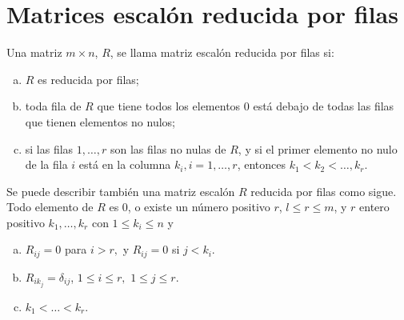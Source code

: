 \begin{comment}
	Generalizando obtenemos que para realizar el intercambio de $R_i$ y $R_j$, la secuencia de operaciones elementales de los otros tipos es: 

	\begin{enumerate}[a)]
	    \item $R_j\to R_j-R_i$. Restar fila $i$ de la fila $j$, que da como resultado una fila $j$ como el negativo de la fila original $i$.
	    \item $R_j\to -R_j$. Fila negativa $j$ lo que resultará en la fila $j$ cambiando a fila $i$.
	    \item $R_j\to R_i-R_j$. Restar fila $j$ de la fila $i$ que resultará en la fila $i$ cambiando a la fila original $j$.\\\\
	\end{enumerate}

    \item 

\end{enumerate}

\end{comment}

\section{Matrices escalón reducida por filas}

\begin{tcolorbox}
    \begin{def.}
	Una matriz $m\times n$, $R$, se llama matriz escalón reducida por filas si:
	\begin{enumerate}[(a)]
	    \item $R$ es reducida por filas;
	    \item toda fila de $R$ que tiene todos los elementos $0$ está debajo de todas las filas que tienen elementos no nulos;
	    \item si las filas $1,\ldots, r$ son las filas no nulas de $R$, y si el primer elemento no nulo de la fila $i$ está en la columna $k_i, i=1,\ldots, r$, entonces $k_1<k_2<\ldots,k_r.$
	\end{enumerate}
	Se puede describir también una matriz escalón $R$ reducida por filas como sigue. Todo elemento de $R$ es $0$, o existe un número positivo $r$, $l\leq r \leq m$, y $r$ entero positivo $k_1,\ldots ,k_r$ con $1\leq k_i\leq n$ y
	\begin{enumerate}[(a)]
	    \item $R_{ij}=0$ para $i>r,$ y $R_{ij}=0$ si $j<k_i$.
	    \item $R_{ik_j}=\delta_{ij}$, $1\leq i \leq r,$ $1\leq j\leq r$.
	    \item $k_1<\ldots < k_r$.
	\end{enumerate}
    \end{def.}
\end{tcolorbox}

